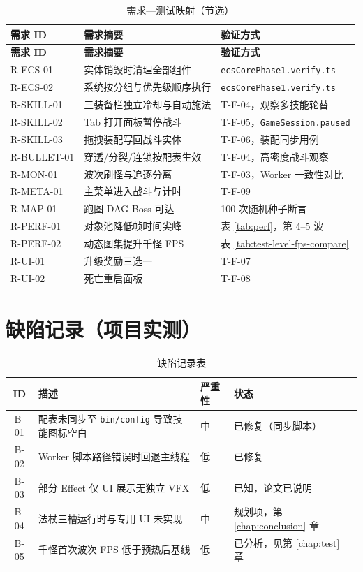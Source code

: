 \documentclass[UTF8,a4paper]{ctexart}
\begin{document}
\begin{longtable}{p{2.2cm}p{4.2cm}p{6.8cm}}
  \caption{需求—测试映射（节选）} \label{tab:req-test-matrix} \\
  \toprule
  \textbf{需求 ID} & \textbf{需求摘要} & \textbf{验证方式} \\
  \midrule
  \endfirsthead
  \toprule
  \textbf{需求 ID} & \textbf{需求摘要} & \textbf{验证方式} \\
  \midrule
  \endhead
  R-ECS-01 & 实体销毁时清理全部组件 & \texttt{ecsCorePhase1.verify.ts} \\
  R-ECS-02 & 系统按分组与优先级顺序执行 & \texttt{ecsCorePhase1.verify.ts} \\
  R-SKILL-01 & 三装备栏独立冷却与自动施法 & T-F-04，观察多技能轮替 \\
  R-SKILL-02 & Tab 打开面板暂停战斗 & T-F-05，\texttt{GameSession.paused} \\
  R-SKILL-03 & 拖拽装配写回战斗实体 & T-F-06，装配同步用例 \\
  R-BULLET-01 & 穿透/分裂/连锁按配表生效 & T-F-04，高密度战斗观察 \\
  R-MON-01 & 波次刷怪与追逐分离 & T-F-03，Worker 一致性对比 \\
  R-META-01 & 主菜单进入战斗与计时 & T-F-09 \\
  R-MAP-01 & 跑图 DAG Boss 可达 & 100 次随机种子断言 \\
  R-PERF-01 & 对象池降低帧时间尖峰 & 表 \ref{tab:perf}，第 4--5 波 \\
  R-PERF-02 & 动态图集提升千怪 FPS & 表 \ref{tab:test-level-fps-compare} \\
  R-UI-01 & 升级奖励三选一 & T-F-07 \\
  R-UI-02 & 死亡重启面板 & T-F-08 \\
  \bottomrule
\end{longtable}

\chapter{缺陷记录（项目实测）}
\label{app:bugs}

\begin{table}[htbp]
  
  \caption{缺陷记录表}
  \begin{tabular}{clll}
    \toprule
    ID & 描述 & 严重性 & 状态 \\
    \midrule
    B-01 & 配表未同步至 \texttt{bin/config} 导致技能图标空白 & 中 & 已修复（同步脚本） \\
    B-02 & Worker 脚本路径错误时回退主线程 & 低 & 已修复 \\
    B-03 & 部分 Effect 仅 UI 展示无独立 VFX & 低 & 已知，论文已说明 \\
    B-04 & 法杖三槽运行时与专用 UI 未实现 & 中 & 规划项，第 \ref{chap:conclusion} 章 \\
    B-05 & 千怪首次波次 FPS 低于预热后基线 & 低 & 已分析，见第 \ref{chap:test} 章 \\
    \bottomrule
  \end{tabular}
\end{table}
\end{document}

